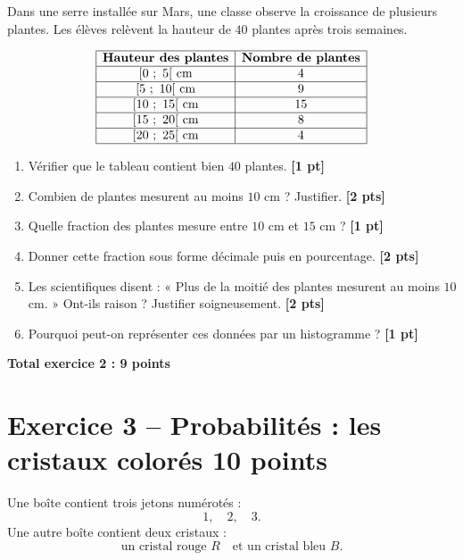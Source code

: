 \documentclass[11pt,a4paper]{article}
\newcommand{\pts}[1]{\hfill \textbf{[#1 pt]}}
\newcommand{\ptss}[1]{\hfill \textbf{[#1 pts]}}
\begin{document}
Dans une serre installée sur Mars, une classe observe la croissance de plusieurs plantes.
Les élèves relèvent la hauteur de $40$ plantes après trois semaines.

\[
\begin{array}{|c|c|}
\hline
\textbf{Hauteur des plantes} & \textbf{Nombre de plantes} \\
\hline
[0\ ;\ 5[ \text{ cm} & 4 \\
\hline
[5\ ;\ 10[ \text{ cm} & 9 \\
\hline
[10\ ;\ 15[ \text{ cm} & 15 \\
\hline
[15\ ;\ 20[ \text{ cm} & 8 \\
\hline
[20\ ;\ 25[ \text{ cm} & 4 \\
\hline
\end{array}
\]

\begin{enumerate}[label=\textbf{\arabic*)}]

\item Vérifier que le tableau contient bien $40$ plantes. \pts{1}

\item Combien de plantes mesurent au moins $10$ cm ? Justifier. \ptss{2}

\item Quelle fraction des plantes mesure entre $10$ cm et $15$ cm ? \pts{1}

\item Donner cette fraction sous forme décimale puis en pourcentage. \ptss{2}

\item Les scientifiques disent : « Plus de la moitié des plantes mesurent au moins $10$ cm. »
Ont-ils raison ? Justifier soigneusement. \ptss{2}

\item Pourquoi peut-on représenter ces données par un histogramme ? \pts{1}

\end{enumerate}

\hfill \textbf{Total exercice 2 : 9 points}

\section*{Exercice 3 -- Probabilités : les cristaux colorés \hfill 10 points}

Une boîte contient trois jetons numérotés :
\[
1,\quad 2,\quad 3.
\]
Une autre boîte contient deux cristaux :
\[
\text{un cristal rouge } R \quad \text{et un cristal bleu } B.
\]
\end{document}
